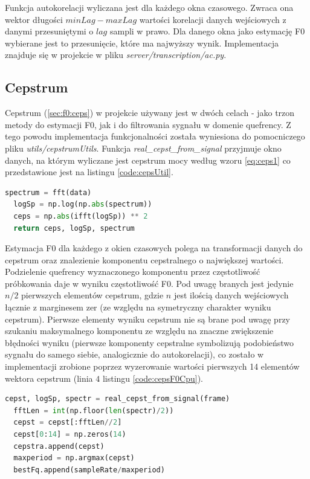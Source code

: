 \documentclass[12pt,a4paper,twoside]{mwart}
\begin{document}
Funkcja autokorelacji wyliczana jest dla każdego okna czasowego. Zwraca ona wektor długości $minLag - maxLag$ wartości korelacji danych wejściowych z danymi przesuniętymi o $lag$ sampli w prawo. Dla danego okna jako estymację F0 wybierane jest to przesunięcie, które ma najwyższy wynik. Implementacja znajduje się w projekcie w pliku \textit{server/transcription/ac.py}.


\subsection{Cepstrum}\label{sec:impl:alg:ceps}
Cepstrum (\ref{sec:f0:ceps}) w projekcie używany jest w dwóch celach - jako trzon metody do estymacji F0, jak i do filtrowania sygnału w domenie quefrency. Z tego powodu implementacja funkcjonalności została wyniesiona do pomocniczego pliku \textit{utils/cepstrumUtils}. Funkcja \textit{real\_cepst\_from\_signal} przyjmuje okno danych, na którym wyliczane jest cepstrum mocy według wzoru \ref{eq:ceps1} co przedstawione jest na listingu \ref{code:cepsUtil}.

\begin{lstlisting}[language=Python, caption={Wyliczanie cepstrum mocy}, captionpos=b, label={code:cepsUtil}]
  spectrum = fft(data)
  logSp = np.log(np.abs(spectrum))
  ceps = np.abs(ifft(logSp)) ** 2
  return ceps, logSp, spectrum
\end{lstlisting}

Estymacja F0 dla każdego z okien czasowych polega na transformacji danych do cepstrum oraz znalezienie komponentu cepstralnego o największej wartości. Podzielenie quefrency wyznaczonego komponentu przez częstotliwość próbkowania daje w wyniku częstotliwość F0. Pod uwagę branych jest jedynie $n / 2$ pierwszych elementów cepstrum, gdzie $n$ jest ilością danych wejściowych łącznie z marginesem zer (ze względu na symetryczny charakter wyniku cepstrum). Pierwsze elementy wyniku cepstrum nie są brane pod uwagę przy szukaniu maksymalnego komponentu ze względu na znaczne zwiększenie błędności wyniku (pierwsze komponenty cepstralne symbolizują podobieństwo sygnału do samego siebie, analogicznie do autokorelacji), co zostało w implementacji zrobione poprzez wyzerowanie wartości pierwszych 14 elementów wektora cepstrum (linia $4$ listingu \ref{code:cepsF0Cpu}). 

\begin{lstlisting}[language=Python, caption={Estymacja F0 przy pomocy cepstrum}, captionpos=b, label={code:cepsF0Cpu}]
  cepst, logSp, spectr = real_cepst_from_signal(frame)
  fftLen = int(np.floor(len(spectr)/2))
  cepst = cepst[:fftLen//2]
  cepst[0:14] = np.zeros(14)
  cepstra.append(cepst)
  maxperiod = np.argmax(cepst)
  bestFq.append(sampleRate/maxperiod)
\end{lstlisting}
\end{document}

